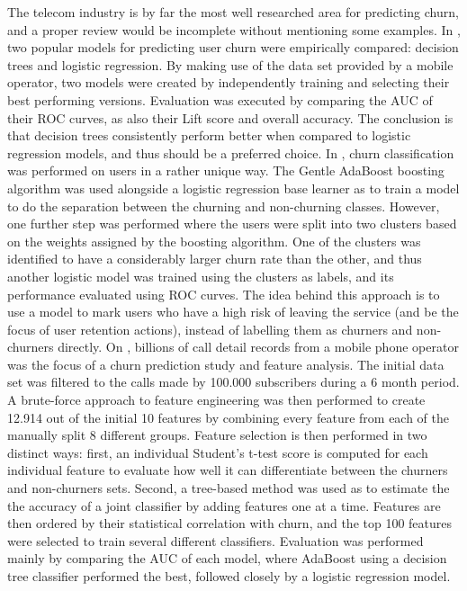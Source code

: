 \documentclass{kththesis}
\begin{document}
The telecom industry is by far the most well researched area for predicting churn, and a proper review would be incomplete without mentioning some examples. In \citep{Hassouna2015}, two popular models for predicting user churn were empirically compared: decision trees and logistic regression. By making use of the data set provided by a mobile operator, two models were created by independently training and selecting their best performing versions. Evaluation was executed by comparing the AUC of their ROC curves, as also their Lift score and overall accuracy. The conclusion is that decision trees consistently perform better when compared to logistic regression models, and thus should be a preferred choice. In \citep{Lu2014}, churn classification was performed on users in a rather unique way. The Gentle AdaBoost boosting algorithm was used alongside a logistic regression base learner as to train a model to do the separation between the churning and non-churning classes. However, one further step was performed where the users were split into two clusters based on the weights assigned by the boosting algorithm. One of the clusters was identified to have a considerably larger churn rate than the other, and thus another logistic model was trained using the clusters as labels, and its performance evaluated using ROC curves. The idea behind this approach is to use a model to mark users who have a high risk of leaving the service (and be the focus of user retention actions), instead of labelling them as churners and non-churners directly. On \citep{Khan2015}, billions of call detail records from a mobile phone operator was the focus of a churn prediction study and feature analysis. The initial data set was filtered to the calls made by 100.000 subscribers during a 6 month period. A brute-force approach to feature engineering was then performed to create 12.914 out of the initial 10 features by combining every feature from each of the manually split 8 different groups. Feature selection is then performed in two distinct ways: first, an individual Student's t-test score is computed for each individual feature to evaluate how well it can differentiate between the churners and non-churners sets. Second, a tree-based method was used as to estimate the the accuracy of a joint classifier by adding features one at a time. Features are then ordered by their statistical correlation with churn, and the top 100 features were selected to train several different classifiers. Evaluation was performed mainly by comparing the AUC of each model, where AdaBoost using a decision tree classifier performed the best, followed closely by a logistic regression model.
\end{document}
